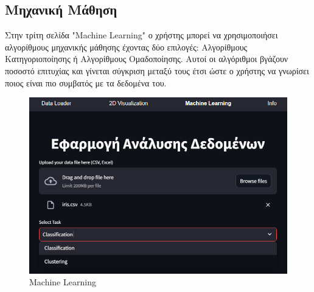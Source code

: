 \documentclass{article}
\begin{document}
{{{{{{\subsection{Μηχανική Μάθηση}
Στην τρίτη σελίδα "Machine Learning" ο χρήστης μπορεί να χρησιμοποιήσει αλγορίθμους μηχανικής μάθησης έχοντας δύο επιλογές: Αλγορίθμους Κατηγοριοποίησης ή  Αλγορίθμους Ομαδοποίησης. Αυτοί οι αλγόριθμοι βγάζουν ποσοστό επιτυχίας και γίνεται σύγκριση μεταξύ τους έτσι ώστε ο χρήστης να γνωρίσει ποιος είναι πιο συμβατός με τα δεδομένα του.
\begin{figure}[h!]
  \centering
  \includegraphics[width=0.6\textheight]{photos/machine_learning.png}
  \caption{Machine Learning}
  \label{fig:MachineLearning}
\end{figure}

}}}}}}
\end{document}
